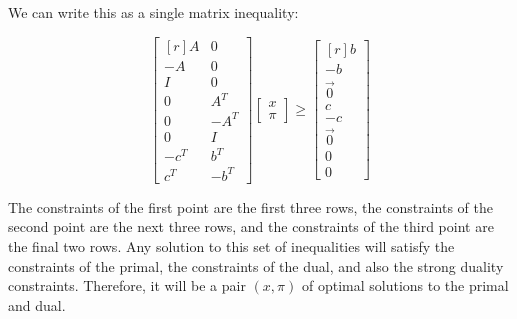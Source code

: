 \documentclass[fleqn]{homework}
\begin{document}
\begin{problem}{6}
    We can write this as a single matrix inequality:

    \begin{equation}
      \begin{bmatrix*}[r]
        A & 0 \\ 
        -A & 0 \\
        I & 0 \\
        0 & A^T \\
        0 & -A^T \\
        0 & I \\
        -c^T & b^T \\ 
        c^T & -b^T 
      \end{bmatrix*}
      \begin{bmatrix*} 
        x \\ \pi
      \end{bmatrix*} \ge
      \begin{bmatrix*}[r]
        b \\ -b \\ \vec{0} \\ c \\ -c \\ \vec{0} \\ 0 \\ 0
      \end{bmatrix*}
    \end{equation}

    The constraints of the first point are the first three rows, the constraints
    of the second point are the next three rows, and the constraints of the
    third point are the final two rows.  Any solution to this set of
    inequalities will satisfy the constraints of the primal, the constraints of
    the dual, and also the strong duality constraints.  Therefore, it will be a
    pair $(x,\pi)$ of optimal solutions to the primal and dual.
  \end{problem}
\end{document}
